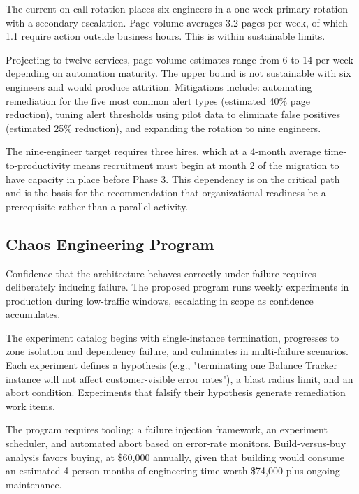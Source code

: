 The current on-call rotation places six engineers in a one-week primary rotation with a secondary escalation. Page volume averages 3.2 pages per week, of which 1.1 require action outside business hours. This is within sustainable limits.

Projecting to twelve services, page volume estimates range from 6 to 14 per week depending on automation maturity. The upper bound is not sustainable with six engineers and would produce attrition. Mitigations include: automating remediation for the five most common alert types (estimated 40\% page reduction), tuning alert thresholds using pilot data to eliminate false positives (estimated 25\% reduction), and expanding the rotation to nine engineers.

The nine-engineer target requires three hires, which at a 4-month average time-to-productivity means recruitment must begin at month 2 of the migration to have capacity in place before Phase 3. This dependency is on the critical path and is the basis for the recommendation that organizational readiness be a prerequisite rather than a parallel activity.

\subsection{Chaos Engineering Program}

Confidence that the architecture behaves correctly under failure requires deliberately inducing failure. The proposed program runs weekly experiments in production during low-traffic windows, escalating in scope as confidence accumulates.

The experiment catalog begins with single-instance termination, progresses to zone isolation and dependency failure, and culminates in multi-failure scenarios. Each experiment defines a hypothesis (e.g., "terminating one Balance Tracker instance will not affect customer-visible error rates"), a blast radius limit, and an abort condition. Experiments that falsify their hypothesis generate remediation work items.

The program requires tooling: a failure injection framework, an experiment scheduler, and automated abort based on error-rate monitors. Build-versus-buy analysis favors buying, at \$60,000 annually, given that building would consume an estimated 4 person-months of engineering time worth \$74,000 plus ongoing maintenance.
